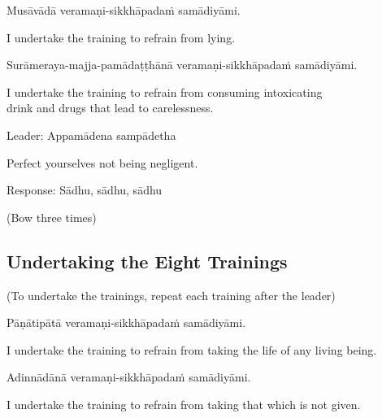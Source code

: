 Musāvādā veramaṇi-sikkhāpadaṁ samādiyāmi.

\begin{english}
  I undertake the training to refrain from lying.
\end{english}

\begin{pali-hang}
Surāmeraya-majja-pamādaṭṭhānā veramaṇi-sikkhāpadaṁ samādiyāmi.
\end{pali-hang}

\begin{english-hang}
  I undertake the training to refrain from consuming intoxicating\\
  drink and drugs that lead to carelessness.\hyperlink{endnote137-appendix}{\hypertarget{endnote137-body}{}}
\end{english-hang}

Leader: Appamādena sampādetha

\begin{english}
  Perfect yourselves not being negligent.
\end{english}

Response: Sādhu, sādhu, sādhu

\begin{center}
  (Bow three times)
\end{center}

\subsection{Undertaking the Eight Trainings}

\begin{center}
  (To undertake the trainings, repeat each training after the leader)
\end{center}

Pāṇātipātā veramaṇi-sikkhāpadaṁ samādiyāmi.

\begin{english-hang}
  I undertake the training to refrain from taking the life of any living being.
\end{english-hang}

Adinnādānā veramaṇi-sikkhāpadaṁ samādiyāmi.

\begin{english-hang}
  I undertake the training to refrain from taking that which is not given.
\end{english-hang}

